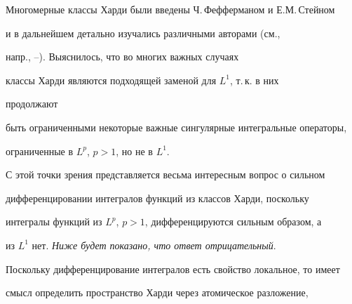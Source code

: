 



\date{}







\pagestyle{plain} %













\maketitle


\label{begin}





Многомерные классы Харди были введены Ч.\,Фефферманом и Е.М.\,Стейном


\cite{F1} и в дальнейшем детально изучались различными авторами (см.,


напр., \cite{S2}--\cite{J4}). Выяснилось, что во многих важных случаях


классы Харди являются подходящей заменой для $L^1$, т.\,к. в них


продолжают


быть ограниченными некоторые важные сингулярные интегральные операторы,


ограниченные в $L^p$, $p>1$, но не в $L^1$.





С этой точки зрения представляется весьма интересным вопрос о сильном


дифференцировании интегралов функций из классов Харди, поскольку


интегралы функций из $L^p$, $p>1$, дифференцируются сильным образом, а


из $L^1$ нет. {\it Ниже будет показано, что ответ отрицательный}.





Поскольку дифференцирование интегралов есть свойство локальное, то имеет


смысл определить пространство Харди через атомическое разложение,



